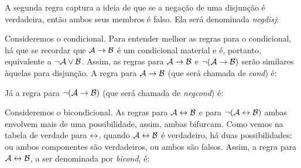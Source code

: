 
A segunda regra captura a ideia de que se a negação de uma disjunção é verdadeira, então ambos seus membros é falso.
Ela será denominada \emph{negdisj}:


Consideremos o condicional.
Para entender melhor as regras para o condicional, há que se recordar que $\mathcal{A} \rightarrow \mathcal{B}$ é um condicional material e é, portanto, equivalente a $\neg\mathcal{A} \vee \mathcal{B}$.
Assim, as regras para $\mathcal{A} \rightarrow \mathcal{B}$ e $\neg(\mathcal{A} \rightarrow \mathcal{B})$ serão similares àquelas para disjunção.
A regra para $\mathcal{A} \rightarrow \mathcal{B}$ (que será chamada de \emph{cond}) é:


Já a regra para  $\neg(\mathcal{A} \rightarrow \mathcal{B})$ (que será chamada de \emph{negcond}) é:


Consideremos o bicondicional.
As regras para $\mathcal{A} \leftrightarrow \mathcal{B}$ e para $\neg(\mathcal{A} \leftrightarrow \mathcal{B})$ ambas envolvem mais de uma possibilidade, assim, ambas bifurcam.
Como vemos na tabela de verdade para $\leftrightarrow$, quando $\mathcal{A} \leftrightarrow \mathcal{B}$ é verdadeiro, há duas possibilidades: ou ambos componentes são verdadeiros, ou ambos são falsos.
Assim, a regra para $\mathcal{A} \leftrightarrow \mathcal{B}$, a ser denominada por \emph{bicond}, é:


